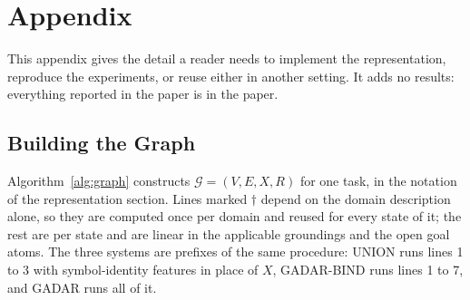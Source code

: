\documentclass{article} %
\newcommand{\gadar}{GADAR}                 %
\newcommand{\gadarbind}{\gadar{}-BIND}     %
\newcommand{\union}{UNION}                 %
\begin{document}



\appendix
\section{Appendix}


This appendix gives the detail a reader needs to implement the
representation, reproduce the experiments, or reuse either in another
setting. It adds no results: everything reported in the paper is in the
paper.

\subsection{Building the Graph}
\label{app:pseudocode}

Algorithm~\ref{alg:graph} constructs $\mathcal{G} = (V, E, X, R)$ for one
task, in the notation of the representation section. Lines marked $\dagger$
depend on the domain description alone, so they are computed once per domain
and reused for every state of it; the rest are per state and are linear in
the applicable groundings and the open goal atoms. The three systems are
prefixes of the same procedure: \union{} runs lines 1 to 3 with
symbol-identity features in place of $X$, \gadarbind{} runs lines 1 to 7, and
\gadar{} runs all of it.
\end{document}
